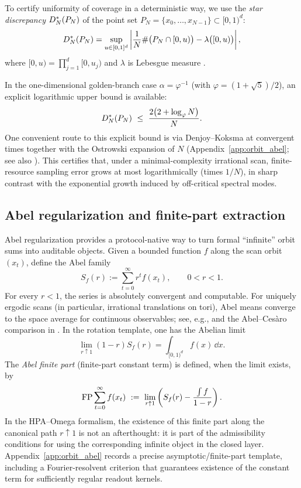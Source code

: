 To certify uniformity of coverage in a deterministic way, we use the \emph{star discrepancy} $D_N^\ast(P_N)$ of the point set $P_N=\{x_0,\dots,x_{N-1}\}\subset[0,1)^d$:
\[
D_N^\ast(P_N)
=\sup_{u\in[0,1]^d}
\left|
\frac{1}{N}\#\bigl(P_N\cap [0,u)\bigr) - \lambda\bigl([0,u)\bigr)
\right|,
\]
where $[0,u)=\prod_{j=1}^d [0,u_j)$ and $\lambda$ is Lebesgue measure \cite{KuipersNiederreiter1974, DrmotaTichy1997}.

In the one-dimensional golden-branch case $\alpha=\varphi^{-1}$ (with $\varphi=(1+\sqrt{5})/2$), an explicit logarithmic upper bound is available:
\[
D_N^\ast(P_N)\ \le\ \frac{2\bigl(2+\log_\varphi N\bigr)}{N}.
\]
One convenient route to this explicit bound is via Denjoy--Koksma at convergent times together with the Ostrowski expansion of $N$ (Appendix~\ref{app:orbit_abel}; see also \cite{Denjoy1932,Koksma1935,KuipersNiederreiter1974}).
This certifies that, under a minimal-complexity irrational scan, finite-resource sampling error grows at most logarithmically (times $1/N$), in sharp contrast with the exponential growth induced by off-critical spectral modes.

\subsection{Abel regularization and finite-part extraction}
\label{sec:abel_finite_part}

Abel regularization provides a protocol-native way to turn formal ``infinite'' orbit sums into auditable objects.
Given a bounded function $f$ along the scan orbit $(x_t)$, define the Abel family
\[
S_f(r):=\sum_{t=0}^{\infty} r^t f(x_t),\qquad 0<r<1.
\]
For every $r<1$, the series is absolutely convergent and computable.
For uniquely ergodic scans (in particular, irrational translations on tori), Abel means converge to the space average for continuous observables; see, e.g., \cite{Walters1982} and the Abel--Ces\`aro comparison in \cite{Hardy1949}.
In the rotation template, one has the Abelian limit
\[
\lim_{r\uparrow 1} (1-r)S_f(r)=\int_{[0,1)^d} f(x)\,\dd x.
\]
The \emph{Abel finite part} (finite-part constant term) is defined, when the limit exists, by
\[
\mathrm{FP}\sum_{t=0}^{\infty} f(x_t)
\ :=\
\lim_{r\uparrow 1}
\left(
S_f(r)-\frac{\int f}{1-r}
\right).
\]
In the HPA--Omega formalism, the existence of this finite part along the canonical path $r\uparrow 1$ is not an afterthought: it is part of the admissibility conditions for using the corresponding infinite object in the closed layer.
Appendix~\ref{app:orbit_abel} records a precise asymptotic/finite-part template, including a Fourier-resolvent criterion that guarantees existence of the constant term for sufficiently regular readout kernels.


